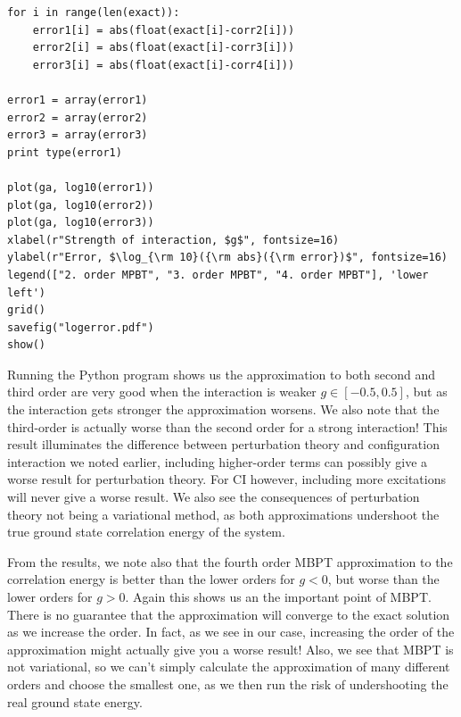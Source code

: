 \documentclass[%
twoside,                 %
final,                   %
10pt]{article}
\newenvironment{doconceexercise}{}{}
\begin{document}
\begin{doconceexercise}
\begin{verbatim}
for i in range(len(exact)):
	error1[i] = abs(float(exact[i]-corr2[i]))
	error2[i] = abs(float(exact[i]-corr3[i]))
	error3[i] = abs(float(exact[i]-corr4[i]))

error1 = array(error1)
error2 = array(error2)
error3 = array(error3)
print type(error1)

plot(ga, log10(error1))
plot(ga, log10(error2))
plot(ga, log10(error3))
xlabel(r"Strength of interaction, $g$", fontsize=16)
ylabel(r"Error, $\log_{\rm 10}({\rm abs}({\rm error})$", fontsize=16)
legend(["2. order MPBT", "3. order MPBT", "4. order MPBT"], 'lower left')
grid()
savefig("logerror.pdf")
show()
\end{verbatim}
Running the Python program shows us 
the approximation to both second and third order are very
good when the interaction is weaker $g\in[-0.5,0.5]$, but as the
interaction gets stronger the approximation worsens. We also
note that the third-order is actually worse than the second order for
a strong interaction! This result illuminates the difference between
perturbation theory and configuration interaction we noted earlier,
including higher-order terms can possibly give a worse result
for perturbation theory. For CI however, including more excitations
will never give a worse result. We also see the consequences of
perturbation theory not being a variational method, as both
approximations undershoot the true ground state correlation energy of
the system.

From the results, we note also that the fourth order MBPT approximation to
the correlation energy is better than the lower orders for $g<0$, but
worse than the lower orders for $g>0$. Again this shows us an the
important point of MBPT. There is no guarantee that the approximation
will converge to the exact solution as we increase the order. In fact,
as we see in our case, increasing the order of the approximation might
actually give you a worse result! Also, we see that MBPT is not
variational, so we can't simply calculate the approximation of many
different orders and choose the smallest one, as we then run the risk
of undershooting the real ground state energy.


\end{doconceexercise}
\end{document}
